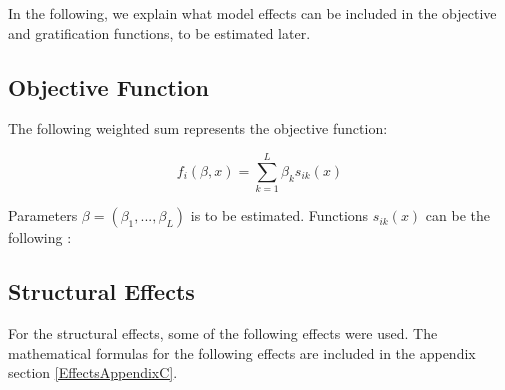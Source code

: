 \documentclass[12pt,letterpaper]{gthesis2}  %
\begin{document}
In the following, we explain what model effects can be included in the objective and gratification functions, to be estimated later.

\subsection*{Objective Function}
The following weighted sum represents the objective function:

\begin{equation}
f_i(\beta, x) = \sum_{k = 1}^{L} \beta_k s_{ik}(x)
\end{equation}

Parameters $\beta = (\beta_1, ..., \beta_L)$ is to be estimated. Functions $s_{ik}(x)$ can be the following \cite{Snijders2004}:

\subsection{Structural Effects}
For the structural effects, some of the following effects were used. The mathematical formulas for the following effects are included in the appendix section \ref{EffectsAppendixC}. 
\end{document}
